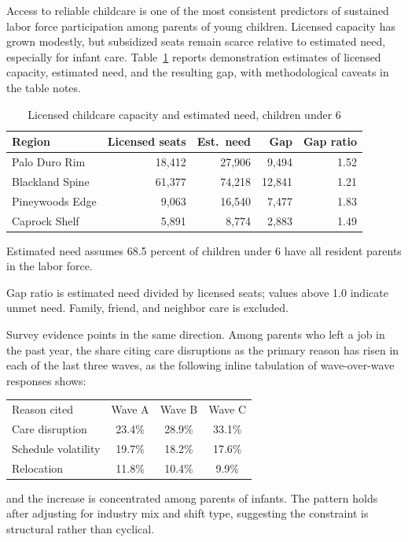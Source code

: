 \documentclass[11pt]{article}
\begin{document}
Access to reliable childcare is one of the most consistent predictors of
sustained labor force participation among parents of young children. Licensed
capacity has grown modestly, but subsidized seats remain scarce relative to
estimated need, especially for infant care. Table~\ref{tab:childcare} reports
demonstration estimates of licensed capacity, estimated need, and the
resulting gap, with methodological caveats in the table notes.

\begin{table}[htbp]
\centering
\begin{threeparttable}
\caption{Licensed childcare capacity and estimated need, children under 6}
\label{tab:childcare}
\begin{tabular}{@{}lrrrr@{}}
\toprule
Region & Licensed seats & Est.\ need & Gap & Gap ratio \\
\midrule
Palo Duro Rim   & 18{,}412 & 27{,}906 & 9{,}494  & 1.52 \\
Blackland Spine & 61{,}377 & 74{,}218 & 12{,}841 & 1.21 \\
Pineywoods Edge & 9{,}063  & 16{,}540 & 7{,}477  & 1.83 \\
Caprock Shelf   & 5{,}891  & 8{,}774  & 2{,}883  & 1.49 \\
\bottomrule
\end{tabular}
\begin{tablenotes}\footnotesize
\item[a] Estimated need assumes 68.5 percent of children under 6 have all
resident parents in the labor force.
\item[b] Gap ratio is estimated need divided by licensed seats; values above
1.0 indicate unmet need. Family, friend, and neighbor care is excluded.
\end{tablenotes}
\end{threeparttable}
\end{table}

Survey evidence points in the same direction. Among parents who left a job in
the past year, the share citing care disruptions as the primary reason has
risen in each of the last three waves, as the following inline tabulation of
wave-over-wave responses shows:
\begin{center}
\begin{tabular}{@{}lccc@{}}
Reason cited        & Wave A & Wave B & Wave C \\
Care disruption     & 23.4\% & 28.9\% & 33.1\% \\
Schedule volatility & 19.7\% & 18.2\% & 17.6\% \\
Relocation          & 11.8\% & 10.4\% & 9.9\%  \\
\end{tabular}
\end{center}
and the increase is concentrated among parents of infants. The pattern holds
after adjusting for industry mix and shift type, suggesting the constraint is
structural rather than cyclical.
\end{document}
